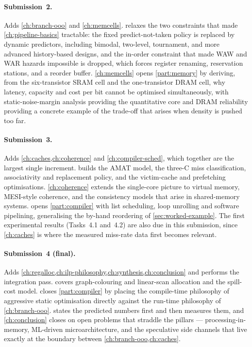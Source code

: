 \documentclass[12pt,a4paper]{report}
\begin{document}
\paragraph{Submission~2.} Adds \cref{ch:branch-ooo} and
\cref{ch:memcells}.  relaxes the two constraints
that made \cref{ch:pipeline-basics} tractable: the fixed
predict-not-taken policy is replaced by dynamic predictors, including
bimodal, two-level, tournament, and more advanced history-based
designs, and the in-order constraint that made WAW and WAR hazards
impossible is dropped, which forces register renaming, reservation
stations, and a reorder buffer. \cref{ch:memcells} opens
\cref{part:memory} by deriving, from the six-transistor SRAM cell and
the one-transistor DRAM cell, why latency, capacity and cost per bit
cannot be optimised simultaneously, with static-noise-margin analysis
providing the quantitative core and DRAM reliability providing a
concrete example of the trade-off that arises when density is pushed
too far.

\paragraph{Submission~3.} Adds \cref{ch:caches,ch:coherence} and
\cref{ch:compiler-sched}, which together are the largest single
increment.  builds the AMAT model, the three-C miss
classification, associativity and replacement policy, and the
victim-cache and prefetching optimisations. \cref{ch:coherence} extends
the single-core picture to virtual memory, MESI-style coherence, and
the consistency models that arise in shared-memory systems.
 opens \cref{part:compiler} with list
scheduling, loop unrolling and software pipelining, generalising the
by-hand reordering of \cref{sec:worked-example}. The first experimental
results (Tasks~4.1 and~4.2) are also due in this submission, since
\cref{ch:caches} is where the measured miss-rate data first becomes
relevant.

\paragraph{Submission~4 (final).} Adds
\cref{ch:regalloc,ch:ilp-philosophy,ch:synthesis,ch:conclusion} and
performs the integration pass.  covers graph-colouring
and linear-scan allocation and the spill-cost model.
 closes \cref{part:compiler} by placing the
compile-time philosophy of aggressive static optimisation directly
against the run-time philosophy of \cref{ch:branch-ooo}.
 states the predicted numbers first and then
measures them, and \cref{ch:conclusion} closes on open problems that
straddle the pillars --- processing-in-memory, ML-driven
microarchitecture, and the speculative side channels that live
exactly at the boundary between
\cref{ch:branch-ooo,ch:caches}.
\end{document}
